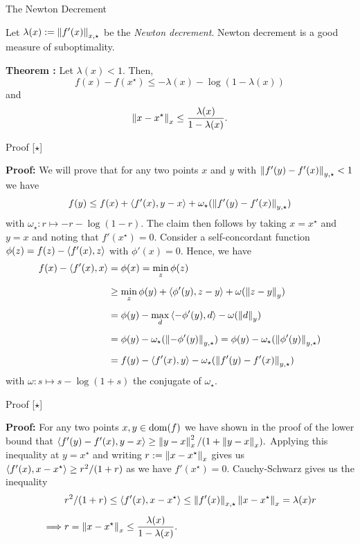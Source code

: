 \documentclass[9pt]{beamer}
\begin{document}
\begin{frame}{The Newton Decrement}

  Let $\lambda(x) := \left\|f'(x)\right\|_{x, \star}$ be the \emph{Newton decrement}. Newton decrement is a good measure of suboptimality.

  \vfill

  \textbf{Theorem :} Let $\lambda(x)<1$. Then,
  \[
    f(x)-f(x^\star) \leq  -\lambda(x) - \log(1-\lambda(x))
  \]
  and
  \[
    \left\|x-x^\star\right\|_x \leq \frac{\lambda(x)}{1-\lambda(x)}. 
  \]

\end{frame}

\begin{frame}{Proof [$\star$]}

  \textbf{Proof:} We will prove that for any two points $x$ and $y$ with $\left\|f'(y)-f'(x)\right\|_{y, \star}<1$ we have
  \[
    f(y) \leq f(x) + \left<f'(x), y-x\right> + \omega_\star(\left\|f'(y)-f'(x)\right\|_{y, \star})
  \]
  with $\omega_\star: r\mapsto -r-\log(1-r)$. The claim then follows by taking $x=x^\star$ and $y=x$ and noting that $f'(x^\star)=0$.
%
  Consider a self-concordant function
  \(
    \phi(z) = f(z)-\left<f'(x), z\right>
  \)
  with $\phi'(x)=0$. Hence, we have
  \begin{align*}
    f(x) -\left<f'(x), x\right> & = \phi(x) = \min_z \phi(z) \\[0.5em]
                           & \geq \min_z \phi(y) +\left<\phi'(y), z-y\right>+\omega(\left\|z-y\right\|_y) \\[0.5em]
                           & = \phi(y) - \max_d  \left<-\phi'(y), d\right>-\omega(\left\|d\right\|_y) \\[0.5em]
                           & =  \phi(y) -\omega_\star(\left\|-\phi'(y)\right\|_{y, \star}) = \phi(y) -\omega_\star(\left\|\phi'(y)\right\|_{y, \star}) \\[0.5em]
                           & = f(y) - \left<f'(x), y\right> - \omega_\star(\left\|f'(y)-f'(x)\right\|_{y, \star})
  \end{align*}
  with $\omega:s\mapsto s-\log(1+s)$ the conjugate of $\omega_\star$.
\end{frame}

\begin{frame}{Proof [$\star$]}

  \textbf{Proof:}
  For any two points $x, y\in\operatorname{dom}(f)$ we have shown in the proof of the lower bound that
  \(
    \left<f'(y)-f'(x), y-x\right> \geq \left\|y-x\right\|_x^2/(1+\left\|y-x\right\|_x).
  \)
  Applying this inequality at $y=x^\star$ and writing $r:=\left\|x-x^\star\right\|_x$ gives us
  \(
    \left<f'(x), x-x^\star\right> \geq r^2/(1+r)
    \)
    as we have $f'(x^\star)=0$.
  Cauchy-Schwarz gives us the inequality
  \begin{align*}
    &r^2/(1+r)\leq \left<f'(x),  x-x^\star\right> \leq \left\|f'(x)\right\|_{x, \star}\left\|x-x^\star\right\|_x = \lambda(x)r\\[0.5em]
    \implies & r=\left\|x-x^\star\right\|_x\leq \frac{\lambda(x)}{1-\lambda(x)}.
  \end{align*}
  
\end{frame}
\end{document}

